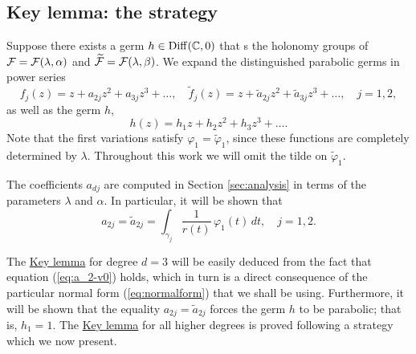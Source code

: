 


\subsection{Key lemma: the strategy}\label{subsec:keylemma}


Suppose there exists a germ $h\in\operatorname{Diff}(\mathbb{C},0)$ that s the holonomy groups of $\mathcal{F}=\mathcal{F}(\lambda,\alpha)$ and $\widetilde{\mathcal{F}}=\mathcal{F}(\lambda,\beta)$. We expand the distinguished parabolic germs in power series
\begin{equation}
  f_j(z)=z+a_{2j}z^2+a_{3j}z^3+\ldots, \quad \tilde{f}_j(z)=z+\tilde{a}_{2j}z^2+\tilde{a}_{3j}z^3+\ldots, \quad j=1,2,
\end{equation}
as well as the germ $h$,
\[ h(z)=h_1z+h_2z^2+h_3z^3+\ldots. \]
Note that the first variations satisfy $\varphi_1=\tilde{\varphi}_1$, since these functions are completely determined by $\lambda$. Throughout this work we will omit the tilde on $\tilde{\varphi}_1$.

The coefficients $a_{dj}$ are computed in Section \ref{sec:analysis} in terms of the parameters $\lambda$ and $\alpha$. In particular, it will be shown that
\begin{equation}\label{eq:a_2-v0}
 a_{2j}=\tilde{a}_{2j}=\int_{\gamma_j}\frac{1}{r(t)}\,\varphi_1(t)\,dt, \quad j=1,2.
\end{equation}

The \hyperref[lemma:key]{Key lemma} for degree $d=3$ will be easily deduced from the fact that equation (\ref{eq:a_2-v0}) holds, which in turn is a direct consequence of the particular normal form (\ref{eq:normalform}) that we shall be using. Furthermore, it will be shown that the equality $a_{2j}=\tilde{a}_{2j}$ forces the germ $h$ to be parabolic; that is, $h_1=1$. The \hyperref[lemma:key]{Key lemma} for all higher degrees is proved following a strategy which we now present.

